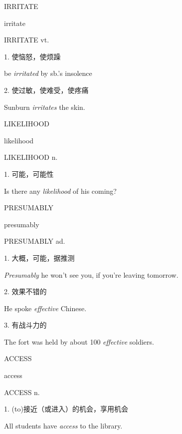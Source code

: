 \begin{flashcard}{
IRRITATE

irritate
}
\begin{center}
IRRITATE vt. 
\end{center}
1. 使恼怒，使烦躁

be \textit{irritated} by sb.'s insolence

2. 使过敏，使难受，使疼痛

Sunburn \textit{irritates} the skin.

\end{flashcard}
\begin{flashcard}{
LIKELIHOOD

likelihood
}
\begin{center}
LIKELIHOOD n. 
\end{center}
1. 可能，可能性

Is there any \textit{likelihood} of his coming?

\end{flashcard}
\begin{flashcard}{
PRESUMABLY

presumably
}
\begin{center}
PRESUMABLY ad. 
\end{center}
1. 大概，可能，据推测

\textit{Presumably} he won't see you, if you're leaving tomorrow.

2. 效果不错的

He spoke \textit{effective} Chinese.

3. 有战斗力的

The fort was held by about 100 \textit{effective} soldiers.

\end{flashcard}
\begin{flashcard}{
ACCESS

access
}
\begin{center}
ACCESS n. 
\end{center}
1. (to)接近（或进入）的机会，享用机会

All students have \textit{access} to the library.

\end{flashcard}

